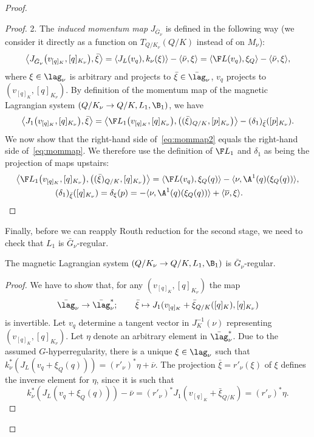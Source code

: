 \begin{proof}
\begin{proof}
2. The {\em induced momentum map} ${J}_{\bar G_\nu}$ is def\/ined in the following way (we consider it directly as a function on $T_{Q/K_{\nu}}(Q/K)$ instead of on $M_\nu$):
\begin{gather}\label{eq:mommap}
\left\langle{J}_{\bar G_\nu}\big(v_{[q]_K}, [q]_{K_\nu}\big), \bar\xi\right\rangle = \langle J_L(v_q),k_\nu(\xi)\rangle - \langle \bar\nu,\xi\rangle = \langle \F L(v_q),\xi_Q\rangle - \langle \bar\nu,\xi\rangle,
\end{gather}
where $\xi \in \lag_\nu$ is arbitrary and projects to $\bar \xi \in \bar \lag_\nu$, $v_q$ projects to $(v_{[q]_K}, [q]_{K_\nu})$.  By def\/inition of the momentum map of the magnetic Lagrangian system $(Q/K_\nu\to Q/K, L_1,\B_1)$, we have
\begin{gather}\label{eq:mommap2}
\left\langle{J}_{1}\big(v_{[q]_K}, [q]_{K_\nu}\big), \bar\xi\right\rangle = \left\langle \F L_1\big(v_{[q]_K}, [q]_{K_\nu}\big),\big( (\bar \xi)_{Q/K},[p]_{K_\nu}\big)\right\rangle -  (\delta_1)_{\bar \xi}([p]_{K_\nu}).
\end{gather}
We now show that the right-hand side of~\eqref{eq:mommap2} equals the right-hand side of~\eqref{eq:mommap}. We therefore use the def\/inition of $\F L_1$ and $\delta_1$ as being the projection of maps upstairs:
\begin{gather*}
   \left\langle \F L_1\big(v_{[q]_K}, [q]_{K_\nu}\big),\big( (\bar \xi)_{Q/K},[q]_{K_\nu}\big)\right\rangle= \langle \F L(v_q),\xi_Q(q)\rangle - \langle \nu,\A^1(q)(\xi_Q(q))\rangle , \\
   (\delta_1)_{\bar \xi}([q]_{K_\nu})= \delta_\xi(p)= - \langle \nu,\A^1(q)(\xi_Q(q))\rangle + \langle \overline\nu,\xi\rangle. \tag*{\qed}
\end{gather*}\renewcommand{\qed}{}
\end{proof}

Finally, before we can reapply Routh reduction for the second stage, we need to check that $L_1$ is $\bar G_\nu$-regular.
\begin{lemma} The magnetic Lagrangian system $(Q/K_\nu\to Q/K, L_1,\B_1)$ is $\bar G_\nu$-regular.
\end{lemma}
\begin{proof}
  We have to show that, for any $(v_{[q]_K},[q]_{K_\nu})$ the map  \[\bar \lag_\nu \to \bar\lag_\nu^*; \qquad \bar \xi \mapsto {J}_{1}(v_{[q]_K}+\bar \xi_{Q/K}([q]_K),[q]_{K_\nu})\] is invertible. Let $v_q$ determine a tangent vector in $J^{-1}_K(\nu)$ representing $(v_{[q]_K},[q]_{K_\nu})$. Let $\eta$ denote an arbitrary element in $\bar \lag_\nu^*$. Due to the assumed $G$-hyperregularity, there is a unique $\xi\in\lag_\nu$ such that $k_\nu^*(J_L(v_q+ \xi_Q(q)))=(r'_\nu)^*\eta + \overline\nu$. The projection $\bar\xi=r'_\nu(\xi)$ of $\xi$ def\/ines the inverse element for $\eta$, since it is such that \[k^*_{\nu}(J_L(v_q+ \xi_Q(q))) - \bar\nu = (r'_\nu)^*{J}_{1} (v_{[q]_K}+\bar \xi_{Q/K})=(r'_\nu)^*\eta. \tag*{\qed}\] \renewcommand{\qed}{}
\end{proof}


\end{proof}
